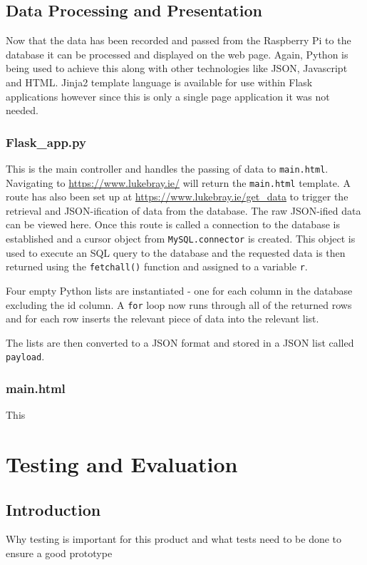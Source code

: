 \documentclass[10pt,a4paper]{article}
\begin{document}
\subsection{Data Processing and Presentation}
Now that the data has been recorded and passed from the Raspberry Pi to the database it can be processed and displayed on the web page. Again, Python is being used to achieve this along with other technologies like JSON, Javascript and HTML. Jinja2 template language is available for use within Flask applications however since this is only a single page application it was not needed. 

\subsubsection{Flask\_app.py}
This is the main controller and handles the passing of data to \texttt{main.html}. Navigating to \url{https://www.lukebray.ie/} will return the \texttt{main.html} template. A route has also been set up at \url{https://www.lukebray.ie/get_data} to trigger the retrieval and JSON-ification of data from the database. The raw JSON-ified data can be viewed here. Once this route is called a connection to the database is established and a cursor object from \texttt{MySQL.connector} is created. This object is used to execute an SQL query to the database and the requested data is then returned using the \texttt{fetchall()} function and assigned to a variable \texttt{r}. 

Four empty Python lists are instantiated - one for each column in the database excluding the id column. A \texttt{for} loop now runs through all of the returned rows and for each row inserts the relevant piece of data into the relevant list. 

The lists are then converted to a JSON format and stored in a JSON list called \texttt{payload}. 

\subsubsection{main.html}
This 


\section{Testing and Evaluation}
\subsection{Introduction}
Why testing is important for this product and what tests need to be done to ensure a good prototype
\end{document}
